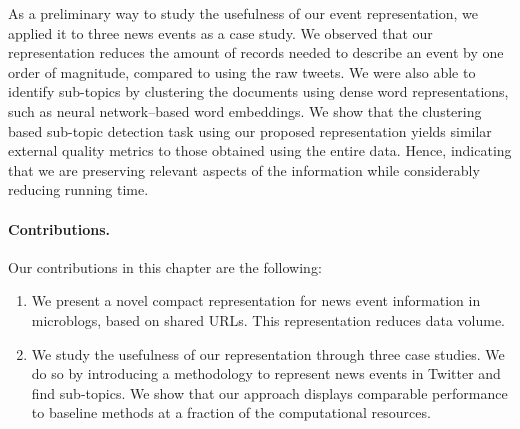 As a preliminary way to study the usefulness of our event representation, we
applied it to three news events as a case study.
%
We observed that our representation reduces the amount of records needed to
describe an event by one order of magnitude, compared to using the raw tweets. 
%
We were also able to identify sub-topics by clustering the documents using dense
word representations, such as neural network--based word embeddings. 
%
We show that the clustering based sub-topic detection task using our proposed
representation yields similar external quality metrics to those obtained using
the entire data. 
%
Hence, indicating that we are preserving relevant aspects of the information
while considerably reducing running time.

\paragraph{Contributions.} Our contributions in this chapter are the following:

\begin{enumerate}
  \item We present a novel compact representation for news event information in
  microblogs, based on shared URLs. This representation reduces data volume.

  \item We study the usefulness of our representation through three case
  studies. We do so by introducing a methodology to represent news events in
  Twitter and find sub-topics. We show that our approach displays comparable
  performance to baseline methods at a fraction of the computational resources.
\end{enumerate}




